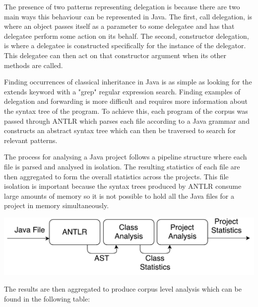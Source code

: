 The presence of two patterns representing delegation is because there are two main ways this behaviour can be represented in Java. The first, call delegation, is where an object passes itself as a parameter to some delegatee and has that delegatee perform some action on its behalf. The second, constructor delegation, is where a delegatee is constructed specifically for the instance of the delegator. This delegatee can then act on that constructor argument when its other methods are called.
\newline

Finding occurrences of classical inheritance in Java is as simple as looking for the extends keyword with a "grep" regular expression search. Finding examples of delegation and forwarding is more difficult and requires more information about the syntax tree of the program. To achieve this, each program of the corpus was passed through ANTLR which parses each file according to a Java grammar and constructs an abstract syntax tree which can then be traversed to search for relevant patterns.
\newline

The process for analysing a Java project follows a pipeline structure where each file is parsed and analysed in isolation. The resulting statistics of each file are then aggregated to form the overall statistics across the projects. This file isolation is important because the syntax trees produced by ANTLR consume large amounts of memory so it is not possible to hold all the Java files for a project in memory simultaneously.
\newline

\includegraphics[scale=0.70]{AntlrPipeline.pdf}

The results are then aggregated to produce corpus level analysis which can be found in the following table:
\newline

